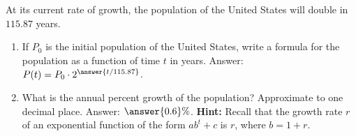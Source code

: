 \documentclass{ximera}
\author{Ivo Terek}
\begin{document}
\licenseY
\begin{exercise}

  At its current rate of growth, the population of the United States will double in $115.87$ years.

  \begin{enumerate}[label=\alph*.]
  \item If $P_0$ is the initial population of the United States, write a formula for the population as a function of time $t$ in years. Answer: $P(t) = P_0 \cdot 2^{\answer{t/115.87}}$.
  \item What is the annual percent growth of the population? Approximate to one decimal place. Answer: $\answer{0.6}\%$. {\bf Hint:} Recall that the growth rate $r$ of an exponential function of the form $ab^t+c$ is $r$, where $b=1+r$.
  \end{enumerate}

\end{exercise}
\end{document}
